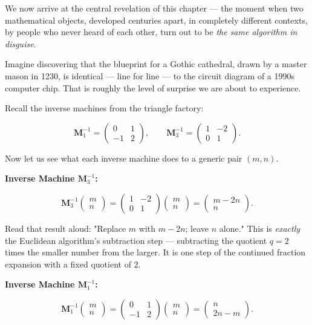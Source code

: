 \documentclass[11pt,openright,twoside]{book}
\theoremstyle{definition}
\begin{document}
We now arrive at the central revelation of this chapter --- the moment when two mathematical objects, developed centuries apart, in completely different contexts, by people who never heard of each other, turn out to be \textit{the same algorithm in disguise}.

Imagine discovering that the blueprint for a Gothic cathedral, drawn by a master mason in 1230, is identical --- line for line --- to the circuit diagram of a 1990s computer chip. That is roughly the level of surprise we are about to experience.

Recall the inverse machines from the triangle factory:

\[
\mathbf{M}_1^{-1} = \begin{pmatrix} 0 & 1 \\ -1 & 2 \end{pmatrix}, \qquad
\mathbf{M}_3^{-1} = \begin{pmatrix} 1 & -2 \\ 0 & 1 \end{pmatrix}.
\]

Now let us see what each inverse machine does to a generic pair $(m, n)$.

\textbf{Inverse Machine $\mathbf{M}_3^{-1}$:}

\[
\mathbf{M}_3^{-1} \begin{pmatrix} m \\ n \end{pmatrix} = \begin{pmatrix} 1 & -2 \\ 0 & 1 \end{pmatrix} \begin{pmatrix} m \\ n \end{pmatrix} = \begin{pmatrix} m - 2n \\ n \end{pmatrix}.
\]

Read that result aloud: "Replace $m$ with $m - 2n$; leave $n$ alone." This is \textit{exactly} the Euclidean algorithm's subtraction step --- subtracting the quotient $q = 2$ times the smaller number from the larger. It is one step of the continued fraction expansion with a fixed quotient of $2$.

\textbf{Inverse Machine $\mathbf{M}_1^{-1}$:}

\[
\mathbf{M}_1^{-1} \begin{pmatrix} m \\ n \end{pmatrix} = \begin{pmatrix} 0 & 1 \\ -1 & 2 \end{pmatrix} \begin{pmatrix} m \\ n \end{pmatrix} = \begin{pmatrix} n \\ 2n - m \end{pmatrix}.
\]
\end{document}
